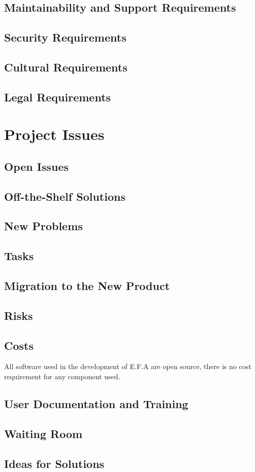 \documentclass[12pt]{report}
\begin{document}
\section{Maintainability and Support Requirements}\label{sec:Support}
\section{Security Requirements}\label{sec:Security}
\section{Cultural Requirements}\label{sec:Cultural}
\section{Legal Requirements}\label{sec:Legal}

\chapter{Project Issues}\label{ch:issues}
\section{Open Issues}\label{sec:issues}
\section{Off-the-Shelf Solutions}\label{sec:solutions}
\section{New Problems}\label{sec:NewProblems}
\section{Tasks}\label{sec:Tasks}
\section{Migration to the New Product}\label{sec:Migration}
\section{Risks}\label{sec:Risks}
\section{Costs}\label{sec:Costs}
All software used in the development of E.F.A are open source, there is no cost 
requirement for any component used.
\section{User Documentation and Training}\label{sec:UserDoc}
\section{Waiting Room}\label{sec:Waiting}
\section{Ideas for Solutions}\label{sec:Solutions}
\end{document}
